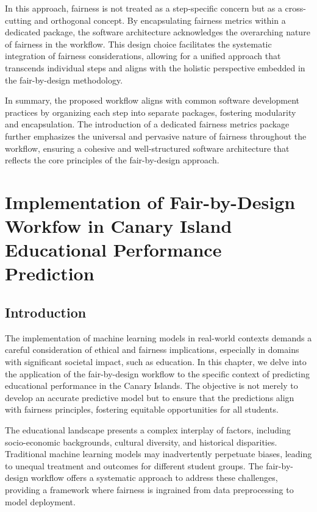 \documentclass[12pt,a4paper,openright,twoside]{book}
\begin{document}
In this approach, fairness is not treated as a step-specific concern but as a cross-cutting and orthogonal concept. By encapsulating fairness metrics within a dedicated package, the software architecture acknowledges the overarching nature of fairness in the workflow. This design choice facilitates the systematic integration of fairness considerations, allowing for a unified approach that transcends individual steps and aligns with the holistic perspective embedded in the fair-by-design methodology.

In summary, the proposed workflow aligns with common software development practices by organizing each step into separate packages, fostering modularity and encapsulation. The introduction of a dedicated fairness metrics package further emphasizes the universal and pervasive nature of fairness throughout the workflow, ensuring a cohesive and well-structured software architecture that reflects the core principles of the fair-by-design approach.

\chapter{Implementation of Fair-by-Design Workfow in Canary Island Educational Performance Prediction}
\label{chap:real-world-scenario}

\section{Introduction}

The implementation of machine learning models in real-world contexts demands a careful consideration of ethical and fairness implications, especially in domains with significant societal impact, such as education. In this chapter, we delve into the application of the fair-by-design workflow to the specific context of predicting educational performance in the Canary Islands. The objective is not merely to develop an accurate predictive model but to ensure that the predictions align with fairness principles, fostering equitable opportunities for all students.

The educational landscape presents a complex interplay of factors, including socio-economic backgrounds, cultural diversity, and historical disparities. Traditional machine learning models may inadvertently perpetuate biases, leading to unequal treatment and outcomes for different student groups. The fair-by-design workflow offers a systematic approach to address these challenges, providing a framework where fairness is ingrained from data preprocessing to model deployment.
\end{document}
